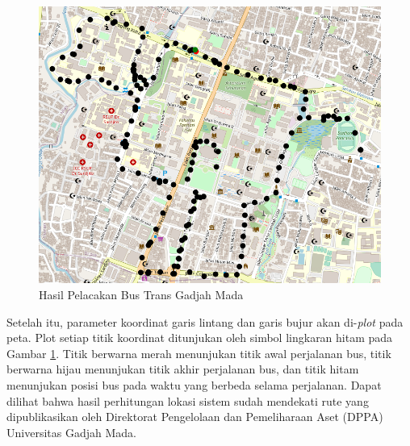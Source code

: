 \begin{figure}[H]
	\centering
	\includegraphics[width=12cm]{contents/chapter-4/pengujian-bergerak/tracked-route.png}
	\caption{Hasil Pelacakan Bus Trans Gadjah Mada}
	\label{Fig: moving-tracked-route}
\end{figure}

Setelah itu, parameter koordinat garis lintang dan garis bujur akan di-\textit{plot} pada peta. Plot setiap titik koordinat ditunjukan oleh simbol lingkaran hitam pada Gambar \ref{Fig: moving-tracked-route}. Titik berwarna merah menunjukan titik awal perjalanan bus, titik berwarna hijau menunjukan titik akhir perjalanan bus, dan titik hitam menunjukan posisi bus pada waktu yang berbeda selama perjalanan. Dapat dilihat bahwa hasil perhitungan lokasi sistem sudah mendekati rute yang dipublikasikan oleh Direktorat Pengelolaan dan Pemeliharaan Aset (DPPA) Universitas Gadjah Mada.

\newpage

